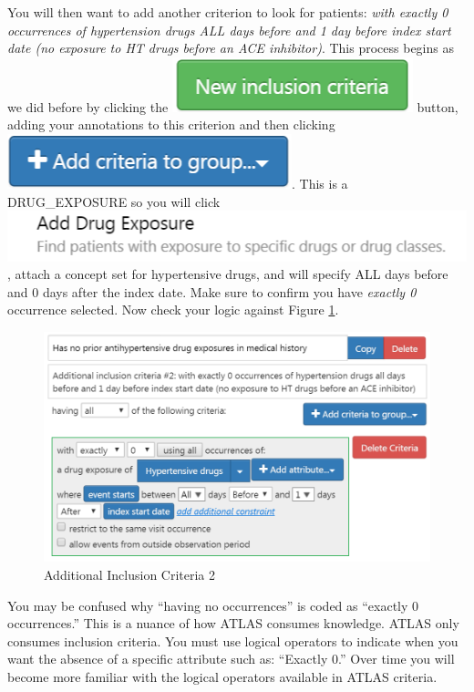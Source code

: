 \documentclass[11pt]{book}
\theoremstyle{definition}
\theoremstyle{definition}
\theoremstyle{definition}
\theoremstyle{remark}
\begin{document}
You will then want to add another criterion to look for patients: \emph{with exactly 0 occurrences of hypertension drugs ALL days before and 1 day before index start date (no exposure to HT drugs before an ACE inhibitor)}. This process begins as we did before by clicking the \includegraphics{images/Cohorts/newinclusion.png} button, adding your annotations to this criterion and then clicking \includegraphics{images/Cohorts/additionalcriteria.png}. This is a DRUG\_EXPOSURE so you will click \includegraphics{images/Cohorts/add-drugexposure.png}, attach a concept set for hypertensive drugs, and will specify ALL days before and 0 days after the index date. Make sure to confirm you have \emph{exactly 0} occurrence selected. Now check your logic against Figure \ref{fig:ATLASIC2}.

\begin{figure}

{\centering \includegraphics[width=0.9\linewidth]{images/Cohorts/ATLAS-IC2} 

}

\caption{Additional Inclusion Criteria 2}\label{fig:ATLASIC2}
\end{figure}

You may be confused why ``having no occurrences'' is coded as ``exactly 0 occurrences.'' This is a nuance of how ATLAS consumes knowledge. ATLAS only consumes inclusion criteria. You must use logical operators to indicate when you want the absence of a specific attribute such as: ``Exactly 0.'' Over time you will become more familiar with the logical operators available in ATLAS criteria.
\end{document}
